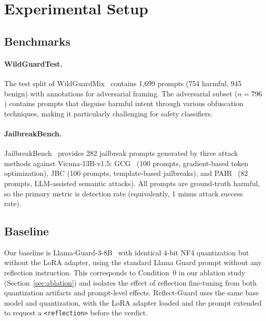 \documentclass[Superintelligence,article,submit,pdftex,moreauthors]{Definitions/mdpi}
\begin{document}
\section{Experimental Setup}

\subsection{Benchmarks}

\paragraph{WildGuardTest.} The test split of WildGuardMix~\citep{han2024wildguard} contains 1{,}699 prompts (754 harmful, 945 benign) with annotations for adversarial framing. The adversarial subset ($n = 796$) contains prompts that disguise harmful intent through various obfuscation techniques, making it particularly challenging for safety classifiers.

\paragraph{JailbreakBench.} JailbreakBench~\citep{chao2024jailbreakbench} provides 282 jailbreak prompts generated by three attack methods against Vicuna-13B-v1.5: GCG~\citep{zou2023universal} (100 prompts, gradient-based token optimization), JBC (100 prompts, template-based jailbreaks), and PAIR~\citep{chao2023jailbreaking} (82 prompts, LLM-assisted semantic attacks). All prompts are ground-truth harmful, so the primary metric is detection rate (equivalently, 1 minus attack success rate).

\subsection{Baseline}

Our baseline is Llama-Guard-3-8B~\citep{metallamaguard3} with identical 4-bit NF4 quantization but without the LoRA adapter, using the standard Llama Guard prompt without any reflection instruction. This corresponds to Condition~0 in our ablation study (Section~\ref{sec:ablation}) and isolates the effect of reflection fine-tuning from both quantization artifacts and prompt-level effects. Reflect-Guard uses the same base model and quantization, with the LoRA adapter loaded and the prompt extended to request a \texttt{<reflection>} before the verdict.
\end{document}
